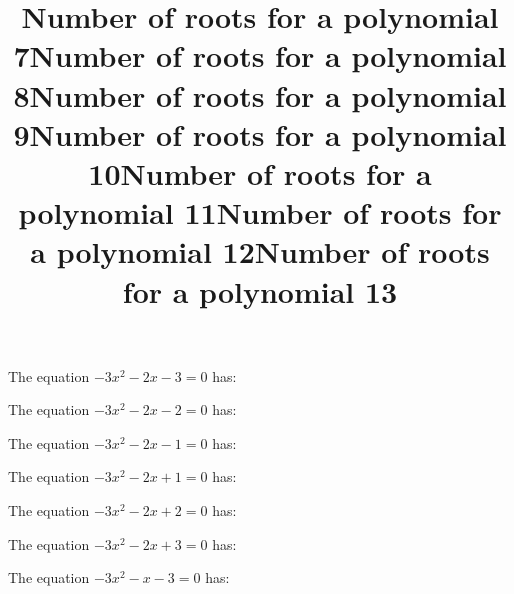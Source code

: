 \documentclass{article}
\begin{document}
\begin{category}
\begin{question}[multichoice]
\end{question}
\begin{question}[multichoice]
\title{Number of roots for a polynomial 7}
The equation $- 3 x^{2} - 2 x - 3=0$ has:


\end{question}
\begin{question}[multichoice]
\title{Number of roots for a polynomial 8}
The equation $- 3 x^{2} - 2 x - 2=0$ has:


\end{question}
\begin{question}[multichoice]
\title{Number of roots for a polynomial 9}
The equation $- 3 x^{2} - 2 x - 1=0$ has:


\end{question}
\begin{question}[multichoice]
\title{Number of roots for a polynomial 10}
The equation $- 3 x^{2} - 2 x + 1=0$ has:


\end{question}
\begin{question}[multichoice]
\title{Number of roots for a polynomial 11}
The equation $- 3 x^{2} - 2 x + 2=0$ has:


\end{question}
\begin{question}[multichoice]
\title{Number of roots for a polynomial 12}
The equation $- 3 x^{2} - 2 x + 3=0$ has:


\end{question}
\begin{question}[multichoice]
\title{Number of roots for a polynomial 13}
The equation $- 3 x^{2} - x - 3=0$ has:


\end{question}
\end{category}
\end{document}
